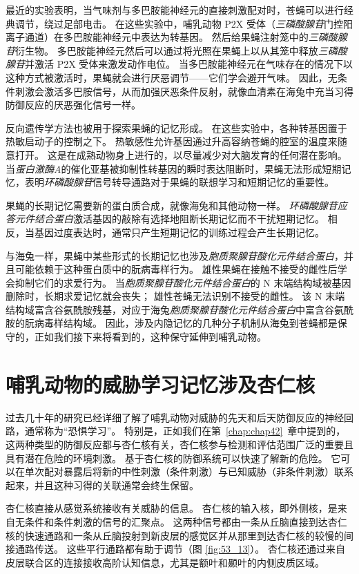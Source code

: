 最近的实验表明，当气味剂与多巴胺能神经元的直接刺激配对时，苍蝇可以进行经典调节，绕过足部电击。
在这些实验中，哺乳动物 P2X 受体（\textit{三磷酸腺苷}门控阳离子通道）在多巴胺能神经元中表达为转基因。
然后给果蝇注射笼中的\textit{三磷酸腺苷}衍生物。
多巴胺能神经元然后可以通过将光照在果蝇上以从其笼中释放\textit{三磷酸腺苷}并激活 P2X 受体来激发动作电位。
当多巴胺能神经元在气味存在的情况下以这种方式被激活时，果蝇就会进行厌恶调节——它们学会避开气味。
因此，无条件刺激会激活多巴胺信号，从而加强厌恶条件反射，就像血清素在海兔中充当习得防御反应的厌恶强化信号一样。


反向遗传学方法也被用于探索果蝇的记忆形成。
在这些实验中，各种转基因置于热敏启动子的控制之下。
热敏感性允许基因通过升高容纳苍蝇的腔室的温度来随意打开。
这是在成熟动物身上进行的，以尽量减少对大脑发育的任何潜在影响。
当\textit{蛋白激酶A}的催化亚基被抑制性转基因的瞬时表达阻断时，果蝇无法形成短期记忆，表明\textit{环磷酸腺苷}信号转导通路对于果蝇的联想学习和短期记忆的重要性。


果蝇的长期记忆需要新的蛋白质合成，就像海兔和其他动物一样。
\textit{环磷酸腺苷应答元件结合蛋白}激活基因的敲除有选择地阻断长期记忆而不干扰短期记忆。
相反，当基因过度表达时，通常只产生短期记忆的训练过程会产生长期记忆。


与海兔一样，果蝇中某些形式的长期记忆也涉及\textit{胞质聚腺苷酸化元件结合蛋白}，并且可能依赖于这种蛋白质中的朊病毒样行为。
雄性果蝇在接触不接受的雌性后学会抑制它们的求爱行为。
当\textit{胞质聚腺苷酸化元件结合蛋白}的 N 末端结构域被基因删除时，长期求爱记忆就会丧失；
雄性苍蝇无法识别不接受的雌性。
该 N 末端结构域富含谷氨酰胺残基，对应于海兔\textit{胞质聚腺苷酸化元件结合蛋白}中富含谷氨酰胺的朊病毒样结构域。
因此，涉及内隐记忆的几种分子机制从海兔到苍蝇都是保守的，正如我们接下来将看到的，这种保守延伸到哺乳动物。



\section{哺乳动物的威胁学习记忆涉及杏仁核}

过去几十年的研究已经详细了解了哺乳动物对威胁的先天和后天防御反应的神经回路，通常称为“恐惧学习”。
特别是，正如我们在第~\ref{chap:chap42}~章中提到的，这两种类型的防御反应都与杏仁核有关，杏仁核参与检测和评估范围广泛的重要且具有潜在危险的环境刺激。
基于杏仁核的防御系统可以快速了解新的危险。
它可以在单次配对暴露后将新的中性刺激（条件刺激）与已知威胁（非条件刺激）联系起来，并且这种习得的关联通常会终生保留。


杏仁核直接从感觉系统接收有关威胁的信息。
杏仁核的输入核，即外侧核，是来自无条件和条件刺激的信号的汇聚点。
这两种信号都由一条从丘脑直接到达杏仁核的快速通路和一条从丘脑投射到新皮层的感觉区并从那里到达杏仁核的较慢的间接通路传送。
这些平行通路都有助于调节（图 \ref{fig:53_13}）。
杏仁核还通过来自皮层联合区的连接接收高阶认知信息，尤其是额叶和颞叶的内侧皮质区域。


